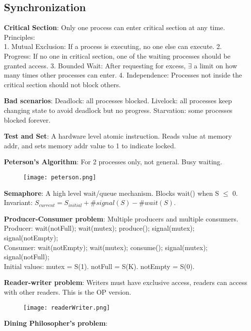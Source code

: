 \documentclass[a4paper,landscape]{article}
\newcommand{\rntopic}[1]{\vspace{-1.5em}\subsection*{#1}\vspace{-0.5em}}
\newcommand{\rnname}[1]{\textbf{#1}}
\begin{document}
\begin{multicols*}{4}
\rntopic{Synchronization}
\begin{flatitemize}
\item \rnname{Critical Section}: Only one process can enter critical section at any time. Principles: \\
1. Mutual Exclusion: If a process is executing, no one else can execute.
2. Progress: If no one in critical section, one of the waiting processes should be granted access.
3. Bounded Wait: After requesting for excess, $\exists$ a limit on how many times other processes can enter.
4. Independence: Processes not inside the critical section should not block others.
\item \rnname{Bad scenarios}: Deadlock: all processes blocked. Livelock: all processes keep changing state to avoid deadlock but no progress. Starvation: some processes blocked forever.
\item \rnname{Test and Set}: A hardware level atomic instruction. Reads value at memory addr, and sets memory addr value to 1 to indicate locked.
\item \rnname{Peterson's Algorithm}: For 2 processes only, not general. Busy waiting.
    \begin{figure}[H]
      \texttt{[image: peterson.png]}
    \end{figure}
\item \rnname{Semaphore}: A high level wait/queue mechanism. Blocks wait() when S $\leq$ 0. Invariant: $S_{current} = S_{initial} +  \#signal(S) - \#wait(S)$.
\item \rnname{Producer-Consumer problem}: Multiple producers and multiple consumers.\\
Producer: wait(notFull); wait(mutex); produce(); signal(mutex); signal(notEmpty);\\
Consumer: wait(notEmpty); wait(mutex); consume(); signal(mutex); signal(notFull);\\
Initial values: mutex = S(1). notFull = S(K). notEmpty = S(0).
\item \rnname{Reader-writer problem}: Writers must have exclusive access, readers can access with other readers. This is the OP version.
    \vspace{-1.5em}
    \begin{figure}[H]
      \texttt{[image: readerWriter.png]}
    \end{figure}
    \vspace{-1.5em}
\item \rnname{Dining Philosopher's problem}:
\vspace{-1.5em}

\end{flatitemize}
\end{multicols*}
\end{document}
